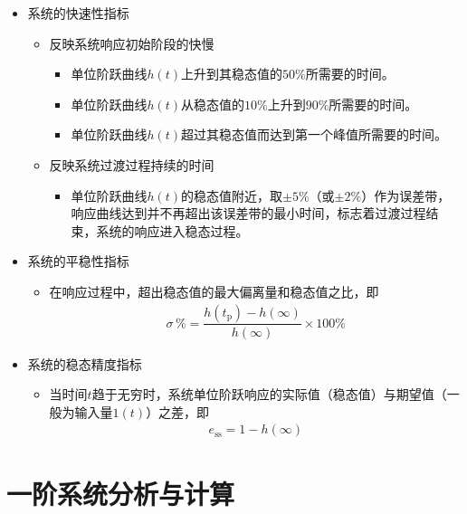 \begin{itemize}
	\item 系统的快速性指标
	\begin{itemize}
		\item 反映系统响应初始阶段的快慢
		\begin{itemize}
			\item {}\quad 单位阶跃曲线$h(t)$上升到其稳态值的$50 \%$所需要的时间。
			\item {}\quad 单位阶跃曲线$h(t)$从稳态值的$10\%$上升到$90\%$所需要的时间。
			\item {}\quad 单位阶跃曲线$h(t)$超过其稳态值而达到第一个峰值所需要的时间。
		\end{itemize}
		\item 反映系统过渡过程持续的时间
		\begin{itemize}
			\item {}\quad 单位阶跃曲线$h(t)$的稳态值附近，取$\pm 5 \%$（或$\pm 2\%$）作为误差带，响应曲线达到并不再超出该误差带的最小时间，标志着过渡过程结束，系统的响应进入稳态过程。
		\end{itemize}
	\end{itemize}
	\item 系统的平稳性指标
	\begin{itemize}
		\item {}\quad 在响应过程中，超出稳态值的最大偏离量和稳态值之比，即
		\begin{align}
			\sigma \,\% = \dfrac{h(t_{\text{p}})-h(\infty)}{h(\infty)} \times 100 \%
		\end{align}
	\end{itemize}
	\item 系统的稳态精度指标
	\begin{itemize}
		\item {}\quad 当时间$t$趋于无穷时，系统单位阶跃响应的实际值（稳态值）与期望值（一般为输入量$1(t)$）之差，即
		\begin{align}
			e_{\text{ss}} = 1 - h(\infty)
		\end{align}
	\end{itemize}
\end{itemize}

\section{一阶系统分析与计算}
